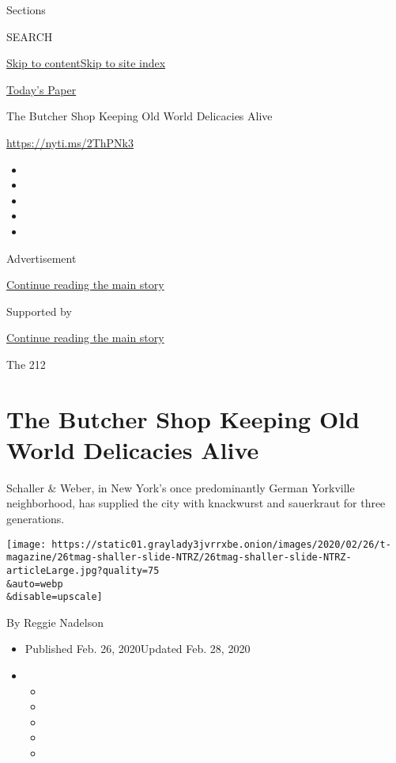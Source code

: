 Sections

SEARCH

\protect\hyperlink{site-content}{Skip to
content}\protect\hyperlink{site-index}{Skip to site index}

\href{https://myaccount.nytimes3xbfgragh.onion/auth/login?response_type=cookie\&client_id=vi}{}

\href{https://www.nytimes3xbfgragh.onion/section/todayspaper}{Today's
Paper}

The Butcher Shop Keeping Old World Delicacies Alive

\url{https://nyti.ms/2ThPNk3}

\begin{itemize}
\item
\item
\item
\item
\item
\end{itemize}

Advertisement

\protect\hyperlink{after-top}{Continue reading the main story}

Supported by

\protect\hyperlink{after-sponsor}{Continue reading the main story}

The 212

\hypertarget{the-butcher-shop-keeping-old-world-delicacies-alive}{%
\section{The Butcher Shop Keeping Old World Delicacies
Alive}\label{the-butcher-shop-keeping-old-world-delicacies-alive}}

Schaller \& Weber, in New York's once predominantly German Yorkville
neighborhood, has supplied the city with knackwurst and sauerkraut for
three generations.

\texttt{[image: https://static01.graylady3jvrrxbe.onion/images/2020/02/26/t-magazine/26tmag-shaller-slide-NTRZ/26tmag-shaller-slide-NTRZ-articleLarge.jpg?quality=75\\\&auto=webp\\\&disable=upscale]}

By Reggie Nadelson

\begin{itemize}
\item
  Published Feb. 26, 2020Updated Feb. 28, 2020
\item
  \begin{itemize}
  \item
  \item
  \item
  \item
  \item
  \end{itemize}
\end{itemize}

